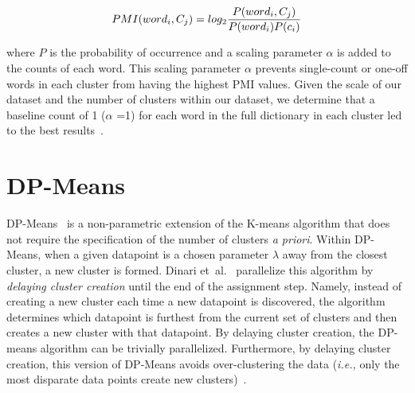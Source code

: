 \vspace{-10pt}
\begin{align*}
\scriptsize
PMI(word_i, C_j) = log_2\frac{P(word_i,C_j)}{P(word_i) P(c_i)}
\end{align*}
\vspace{-10pt}

\noindent where $P$ is the probability of occurrence and a scaling parameter $\alpha$ is added to the counts of each word. This scaling parameter $\alpha$ prevents single-count or one-off words in each cluster from having the highest PMI values. Given the scale of our dataset and the number of clusters within our dataset, we determine that a baseline count of 1 ($\alpha$ =1) for each word in the full dictionary in each cluster led to the best results~\cite{turney2001mining}. 


\section{DP-Means\label{sec:ap-dpmeans}}

DP-Means~\cite{kulis2011revisiting} is a non-parametric extension of the K-means algorithm that does not require the specification of the number of clusters \textit{a priori}. Within DP-Means, when a given datapoint is a chosen parameter $\lambda$ away from the closest cluster, a new cluster is formed. Dinari {et~al.}~\cite{dinari2022revisiting} parallelize this algorithm by \textit{delaying cluster creation} until the end of the assignment step. Namely, instead of creating a new cluster each time a new datapoint is discovered, the algorithm determines which datapoint is furthest from the current set of clusters and then creates a new cluster with that datapoint. By delaying cluster creation, the DP-means algorithm can be trivially parallelized. Furthermore, by delaying cluster creation, this version of DP-Means avoids over-clustering the data (\textit{i.e.,} only the most disparate data points create new clusters)~\cite{dinari2022revisiting}.

\clearpage
\newpage
